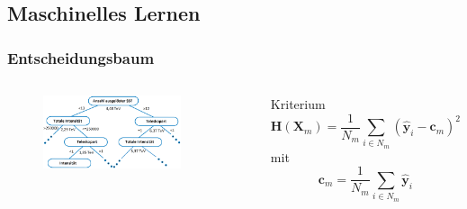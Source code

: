 \documentclass[aspectratio=1610, professionalfonts, 9pt]{beamer}
\begin{document}
  \subsection{Maschinelles Lernen}

  \begin{frame}
    \frametitle{Entscheidungsbaum}
    \begin{columns}
      \begin{figure}
        \includegraphics[width=0.8\textwidth]{pictures/Decisiontree.png}
        \caption{}
        \label{abb:DT}
      \end{figure}
      \begin{block}{Kriterium}
        \begin{equation*}
          \symbf{H}(\symbf{X}_m) = \frac{1}{N_m}\sum_{i\in N_m}(\symbf{\hat{y}}_i-\symbf{c}_m)^2
        \end{equation*}
        mit
        \begin{equation*}
          \symbf{c}_m = \frac{1}{N_m}\sum_{i\in N_m}\symbf{\hat{y}}_i
        \end{equation*}
      \end{block}
    \end{columns}

  \end{frame}
\end{document}
